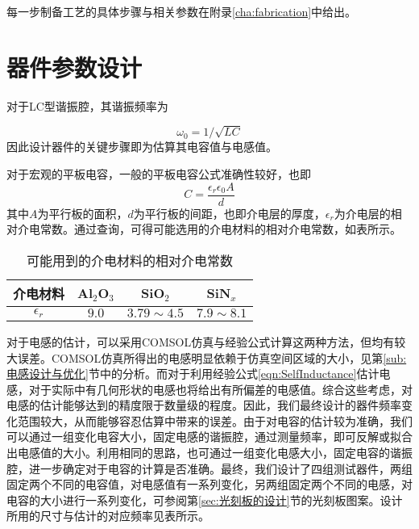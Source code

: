             每一步制备工艺的具体步骤与相关参数在附录\ref{cha:fabrication}中给出。
            


        \section{器件参数设计} %
        \label{sec:器件参数设计}

            对于LC型谐振腔，其谐振频率为

            \begin{equation}
                \omega_0 = 1/\sqrt{LC}
            \end{equation}
            因此设计器件的关键步骤即为估算其电容值与电感值。

            对于宏观的平板电容，一般的平板电容公式准确性较好，也即
            \begin{equation}
                C = \frac{\epsilon_r \epsilon_0 A }{d}
            \end{equation}
            其中$A$为平行板的面积，$d$为平行板的间距，也即介电层的厚度，$\epsilon_r $为介电层的相对介电常数。通过查询，可得可能选用的介电材料的相对介电常数\cite{cardarelli2008materials}，如表所示。


\begin{table}[htb]
  \centering
  \caption{可能用到的介电材料的相对介电常数\cite{cardarelli2008materials}}
  \label{tab:dielectricConstants}
    \begin{tabular}{c|ccc} %
      \toprule %
      介电材料& Al$_2$O$_3$ & SiO$_2$ & SiN$_x$ \\
      \midrule %
      $\epsilon_r $ & $9.0$ & $3.79\sim 4.5$ & $ 7.9\sim 8.1 $  \\
      \bottomrule %
    \end{tabular}
\end{table}
            
            对于电感的估计，可以采用COMSOL仿真与经验公式计算这两种方法，但均有较大误差。COMSOL仿真所得出的电感明显依赖于仿真空间区域的大小，见第\ref{sub:电感设计与优化}节中的分析。而对于利用经验公式\ref{eqn:SelfInductance}估计电感，对于实际中有几何形状的电感也将给出有所偏差的电感值。综合这些考虑，对电感的估计能够达到的精度限于数量级的程度。因此，我们最终设计的器件频率变化范围较大，从而能够容忍估算中带来的误差。由于对电容的估计较为准确，我们可以通过一组变化电容大小，固定电感的谐振腔，通过测量频率，即可反解或拟合出电感值的大小。利用相同的思路，也可通过一组变化电感大小，固定电容的谐振腔，进一步确定对于电容的计算是否准确。最终，我们设计了四组测试器件，两组固定两个不同的电容值，对电感值有一系列变化，另两组固定两个不同的电感，对电容的大小进行一系列变化，可参阅第\ref{sec:光刻板的设计}节的光刻板图案。设计所用的尺寸与估计的对应频率见表所示。
            
